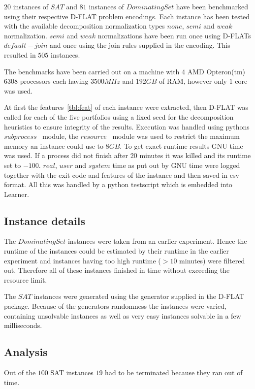 $20$ instances of $SAT$ and $81$ instances of $Dominating Set$ have been benchmarked using their respective D-FLAT problem encodings. Each instance has been tested with the available decomposition normalization types $none$, $semi$ and $weak$ normalization. $semi$ and $weak$ normalizations have been run once using D-FLATs $default-join$ and once using the join rules supplied in the encoding. This resulted in $505$ instances.

The benchmarks have been carried out on a machine with $4$ AMD Opteron(tm) $6308$ processors each having $3500 MHz$ and $192GB$ of RAM, however only $1$ core was used.

At first the features~\ref{tbl:feat} of each instance were extracted, then D-FLAT was called for each of the five portfolios using a fixed seed for the decomposition heuristics to ensure integrity of the results.
Execution was handled using pythons $subprocess$~\cite{www:subprocess} module, the $resource$~\cite{www:resource} module was used to restrict the maximum memory an instance could use to $8 GB$. To get exact runtime results GNU time~\cite{www:time} was used. If a process did not finish after $20$ minutes it was killed and its runtime set to $-100$. $real$, $user$ and $system$ time as put out by GNU time were logged together with the exit code and features of the instance and then saved in csv format. All this was handled by a python testscript which is embedded into Learner.

\subsection{Instance details}
The $Dominating Set$ instances were taken from an earlier experiment. Hence the runtime of the instances could be estimated by their runtime in the earlier experiment and instances having too high runtime ($>10$ minutes) were filtered out. Therefore all of these instances finished in time without exceeding the resource limit.

The $SAT$ instances were generated using the generator supplied in the D-FLAT package. Because of the generators randomness the instances were varied, containing unsolvable instances as well as very easy instances solvable in a few milliseconds.

\subsection{Analysis}
Out of the $100$ SAT instances $19$ had to be terminated because they ran out of time.

